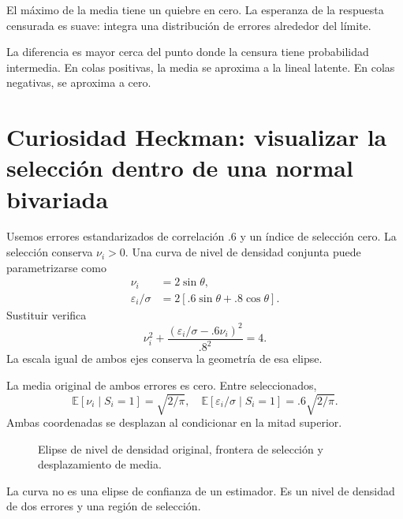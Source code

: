 \documentclass[11pt,a4paper]{article}
\newcommand{\E}{\mathbb E}
\begin{document}
El máximo de la media
tiene un quiebre en cero.
La esperanza de la
respuesta censurada es suave:
integra una distribución
de errores alrededor
del límite.

La diferencia es mayor
cerca del punto donde
la censura tiene probabilidad
intermedia. En colas positivas,
la media se aproxima
a la lineal latente.
En colas negativas,
se aproxima a cero.

\clearpage
\section{Curiosidad Heckman: visualizar la selección dentro de una normal bivariada}\label{unidad175}
Usemos errores estandarizados de
correlación .6 y un
índice de selección cero.
La selección conserva
\(\nu_i>0\).
Una curva de nivel
de densidad conjunta
puede parametrizarse como
\[
\begin{aligned}
\nu_i&=2\sin\theta,\\
\varepsilon_i/\sigma
&=2[.6\sin\theta+.8\cos\theta].
\end{aligned}
\]
Sustituir verifica
\[
\nu_i^2+\frac{(\varepsilon_i/\sigma-.6\nu_i)^2}{.8^2}=4.
\]
La escala igual de
ambos ejes conserva
la geometría de esa elipse.

La media original de
ambos errores es cero.
Entre seleccionados,
\[
\E[\nu_i\mid S_i=1]=\sqrt{2/\pi},
\quad
\E[\varepsilon_i/\sigma\mid S_i=1]
=.6\sqrt{2/\pi}.
\]
Ambas coordenadas se
desplazan al condicionar
en la mitad superior.


\begin{figure}[H]\centering
{}
\caption{Elipse de nivel de densidad original, frontera de selección y desplazamiento de media.}
\end{figure}

La curva no es una
elipse de confianza de
un estimador.
Es un nivel de
densidad de dos errores
y una región de selección.
\end{document}
